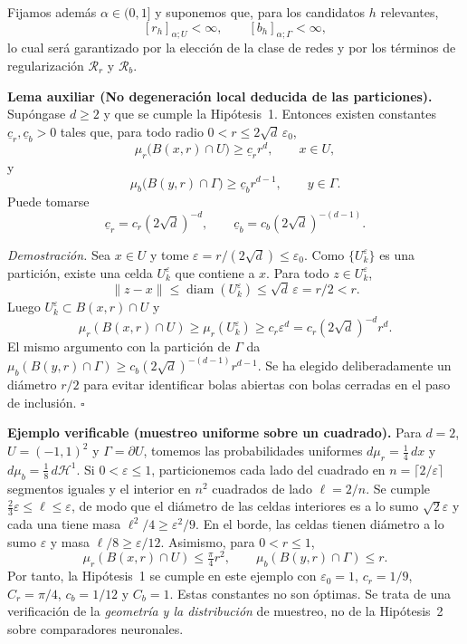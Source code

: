 \medskip
\noindent
Fijamos además $\alpha\in(0,1]$ y suponemos que, para los candidatos $h$ relevantes,
\[
[r_h]_{\alpha;U}<\infty,
\qquad
[b_h]_{\alpha;\Gamma}<\infty,
\]
lo cual será garantizado por la elección de la clase de redes y por los términos de
regularización $\mathcal R_r$ y $\mathcal R_b$.

\medskip
\noindent\textbf{Lema auxiliar (No degeneración local deducida de las particiones).}
Supóngase $d\geq2$ y que se cumple la Hipótesis~1. Entonces existen constantes
$\underline c_r,\underline c_b>0$ tales que, para todo radio
$0<r\leq2\sqrt d\,\varepsilon_0$,
\[
\mu_r\bigl(B(x,r)\cap U\bigr)\geq \underline c_r r^d,
\qquad x\in U,
\]
y
\[
\mu_b\bigl(B(y,r)\cap\Gamma\bigr)\geq \underline c_b r^{d-1},
\qquad y\in\Gamma.
\]
Puede tomarse
\[
\underline c_r=c_r(2\sqrt d)^{-d},
\qquad
\underline c_b=c_b(2\sqrt d)^{-(d-1)}.
\]
\medskip

\noindent\textit{Demostración.}
Sea $x\in U$ y tome $\varepsilon=r/(2\sqrt d)\leq\varepsilon_0$.
Como $\{U_k^\varepsilon\}$ es una partición, existe una celda
$U_k^\varepsilon$ que contiene a $x$. Para todo $z\in U_k^\varepsilon$,
\[
\|z-x\|\leq\operatorname{diam}(U_k^\varepsilon)
\leq\sqrt d\,\varepsilon=r/2<r.
\]
Luego $U_k^\varepsilon\subset B(x,r)\cap U$ y
\[
\mu_r(B(x,r)\cap U)\geq\mu_r(U_k^\varepsilon)
\geq c_r\varepsilon^d=c_r(2\sqrt d)^{-d}r^d.
\]
El mismo argumento con la partición de $\Gamma$ da
$\mu_b(B(y,r)\cap\Gamma)\geq c_b(2\sqrt d)^{-(d-1)}r^{d-1}$.
Se ha elegido deliberadamente un diámetro $r/2$ para evitar identificar
bolas abiertas con bolas cerradas en el paso de inclusión.
\hfill$\square$

\medskip
\noindent\textbf{Ejemplo verificable (muestreo uniforme sobre un cuadrado).}
Para $d=2$, $U=(-1,1)^2$ y $\Gamma=\partial U$, tomemos las
probabilidades uniformes $d\mu_r=\tfrac14\,dx$ y
$d\mu_b=\tfrac18\,d\mathcal H^1$. Si $0<\varepsilon\le1$,
particionemos cada lado del cuadrado en
$n=\lceil2/\varepsilon\rceil$ segmentos iguales y el interior en
$n^2$ cuadrados de lado $\ell=2/n$. Se cumple
$\tfrac23\varepsilon\le\ell\le\varepsilon$, de modo que el
diámetro de las celdas interiores es a lo sumo $\sqrt2\varepsilon$
y cada una tiene masa $\ell^2/4\ge\varepsilon^2/9$.
En el borde, las celdas tienen diámetro a lo sumo
$\varepsilon$ y masa $\ell/8\ge\varepsilon/12$.
Asimismo, para $0<r\le1$,
\[
\mu_r(B(x,r)\cap U)\le\tfrac\pi4 r^2,\qquad
\mu_b(B(y,r)\cap\Gamma)\le r.
\]
Por tanto, la Hipótesis~1 se cumple en este ejemplo con
$\varepsilon_0=1$, $c_r=1/9$, $C_r=\pi/4$,
$c_b=1/12$ y $C_b=1$. Estas constantes no son óptimas.
Se trata de una verificación de la \emph{geometría y la distribución}
de muestreo, no de la Hipótesis~2 sobre comparadores neuronales.

